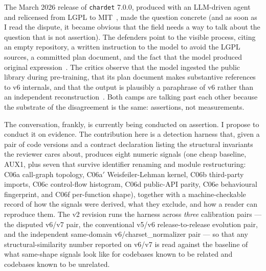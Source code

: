 \documentclass[11pt,letterpaper]{article}
\begin{document}
The March 2026 release of \texttt{chardet} 7.0.0, produced with an
LLM-driven agent and relicensed from LGPL to
MIT~\cite{willison2026chardet,theregister2026chardet,arstechnica2026chardet,
meeker2026chardet,lwn2026chardet}, made the question concrete (and
as soon as I read the dispute, it became obvious that the field
needs a way to talk about the question that is not assertion). The
defenders point to the visible process, citing an empty repository,
a written instruction to the model to avoid the LGPL sources, a
committed plan document, and the fact that the model produced
original expression~\cite{willison2026chardet}. The critics observe
that the model ingested the public library during pre-training,
that its plan document makes substantive references to v6
internals, and that the output is plausibly a paraphrase of v6
rather than an independent
reconstruction~\cite{chardet325,chardet327,meeker2026chardet}. Both
camps are talking past each other because the substrate of the
disagreement is the same: assertions, not measurements.

The conversation, frankly, is currently being conducted on
assertion. I propose to conduct it on evidence. The contribution
here is a detection harness that, given a pair of code versions
and a contract declaration listing the structural invariants the
reviewer cares about, produces eight numeric signals (one cheap
baseline, AUX1, plus seven that survive identifier renaming and
module restructuring: C06a call-graph topology, C06a$'$
Weisfeiler-Lehman kernel, C06b third-party imports, C06c
control-flow histogram, C06d public-API parity, C06e behavioural
fingerprint, and C06f per-function shape), together with a
machine-checkable record of how the signals were derived, what
they exclude, and how a reader can reproduce them. The v2 revision
runs the harness across \emph{three} calibration pairs --- the
disputed v6/v7 pair, the conventional v5/v6 release-to-release
evolution pair, and the independent same-domain v6/charset\_normalizer
pair --- so that any structural-similarity number reported on
v6/v7 is read against the baseline of what same-shape signals
look like for codebases known to be related and codebases known
to be unrelated.
\end{document}
